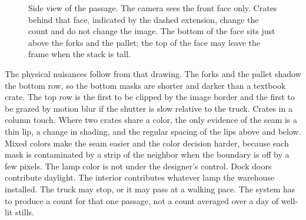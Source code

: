\begin{figure}[t]
\centering
{}
\caption{Side view of the passage. The camera sees the front face only. Crates behind that face, indicated by the dashed extension, change the count and do not change the image. The bottom of the face sits just above the forks and the pallet; the top of the face may leave the frame when the stack is tall.}
\label{fig:scene}
\end{figure}

The physical nuisances follow from that drawing. The forks and the pallet shadow the bottom row, so the bottom masks are shorter and darker than a textbook crate. The top row is the first to be clipped by the image border and the first to be grazed by motion blur if the shutter is slow relative to the truck. Crates in a column touch. Where two crates share a color, the only evidence of the seam is a thin lip, a change in shading, and the regular spacing of the lips above and below. Mixed colors make the seam easier and the color decision harder, because each mask is contaminated by a strip of the neighbor when the boundary is off by a few pixels. The lamp color is not under the designer's control. Dock doors contribute daylight. The interior contributes whatever lamp the warehouse installed. The truck may stop, or it may pass at a walking pace. The system has to produce a count for that one passage, not a count averaged over a day of well-lit stills.

